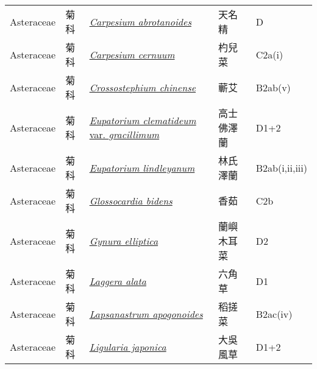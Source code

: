 {\begin{longtable}{p{2.5cm}p{2.5cm}p{4.5cm}p{2.5cm}p{3cm}}
    Asteraceae & 菊科 & \href{http://www.theplantlist.org/tpl1.1/search?q=Carpesium+abrotanoides}{\textit{Carpesium abrotanoides} } & 天名精 & D \index{Carpesium@\textit{Carpesium}!abrotanoides@\textit{abrotanoides}}  \index{天名精} \\
    Asteraceae & 菊科 & \href{http://www.theplantlist.org/tpl1.1/search?q=Carpesium+cernuum}{\textit{Carpesium cernuum} } & 杓兒菜 & C2a(i) \index{Carpesium@\textit{Carpesium}!cernuum@\textit{cernuum}}  \index{杓兒菜} \\
    Asteraceae & 菊科 & \href{http://www.theplantlist.org/tpl1.1/search?q=Crossostephium+chinense}{\textit{Crossostephium chinense} } & 蘄艾 & B2ab(v) \index{Crossostephium@\textit{Crossostephium}!chinense@\textit{chinense}}  \index{蘄艾} \\
    Asteraceae & 菊科 & \href{http://www.theplantlist.org/tpl1.1/search?q=Eupatorium+clematideum+var.+gracillimum}{\textit{Eupatorium clematideum} var. \textit{gracillimum} } & 高士佛澤蘭 & D1+2 \index{Eupatorium@\textit{Eupatorium}!clematideum@\textit{clematideum}!var. gracillimum@var. \textit{gracillimum}}  \index{高士佛澤蘭} \\
    Asteraceae & 菊科 & \href{http://www.theplantlist.org/tpl1.1/search?q=Eupatorium+lindleyanum}{\textit{Eupatorium lindleyanum} } & 林氏澤蘭 & B2ab(i,ii,iii) \index{Eupatorium@\textit{Eupatorium}!lindleyanum@\textit{lindleyanum}}  \index{林氏澤蘭} \\
    Asteraceae & 菊科 & \href{http://www.theplantlist.org/tpl1.1/search?q=Glossocardia+bidens}{\textit{Glossocardia bidens} } & 香茹 & C2b \index{Glossocardia@\textit{Glossocardia}!bidens@\textit{bidens}}  \index{香茹} \\
    Asteraceae & 菊科 & \href{http://www.theplantlist.org/tpl1.1/search?q=Gynura+elliptica}{\textit{Gynura elliptica} } & 蘭嶼木耳菜 & D2 \index{Gynura@\textit{Gynura}!elliptica@\textit{elliptica}}  \index{蘭嶼木耳菜} \\
    Asteraceae & 菊科 & \href{http://www.theplantlist.org/tpl1.1/search?q=Laggera+alata}{\textit{Laggera alata} } & 六角草 & D1 \index{Laggera@\textit{Laggera}!alata@\textit{alata}}  \index{六角草} \\
    Asteraceae & 菊科 & \href{http://www.theplantlist.org/tpl1.1/search?q=Lapsanastrum+apogonoides}{\textit{Lapsanastrum apogonoides} } & 稻搓菜 & B2ac(iv) \index{Lapsanastrum@\textit{Lapsanastrum}!apogonoides@\textit{apogonoides}}  \index{稻搓菜} \\
    Asteraceae & 菊科 & \href{http://www.theplantlist.org/tpl1.1/search?q=Ligularia+japonica}{\textit{Ligularia japonica} } & 大吳風草 & D1+2 \index{Ligularia@\textit{Ligularia}!japonica@\textit{japonica}}  \index{大吳風草} \\

\end{longtable}}
